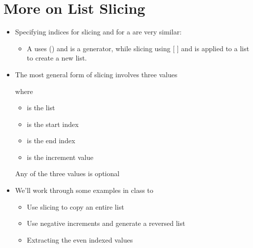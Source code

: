 \documentclass[letterpaper,10pt,english]{sphinxmanual}
\begin{document}
\section{More on List Slicing}
\label{\detokenize{lecture_notes/lec10_lists2:more-on-list-slicing}}\begin{itemize}
\item {} 
Specifying indices for slicing and for a  are very
similar:
\begin{itemize}
\item {} 
A  uses () and is a generator, while slicing
using {[} {]} and is applied to a list to create a new list.

\end{itemize}

\item {} 
The most general form of slicing involves three values

%
\begin{sphinxVerbatim}[commandchars=\\\{\}]
\PYG{p}{[}\PYG{p}{]}
\end{sphinxVerbatim}

where
\begin{itemize}
\item {} 
 is the list

\item {} 
 is the start index

\item {} 
 is the end index

\item {} 
 is the increment value

\end{itemize}

Any of the three values is optional

\item {} 
We’ll work through some examples in class to
\begin{itemize}
\item {} 
Use slicing to copy an entire list

\item {} 
Use negative increments and generate a reversed list

\item {} 
Extracting the even indexed values


\end{itemize}
\end{itemize}
\end{document}
